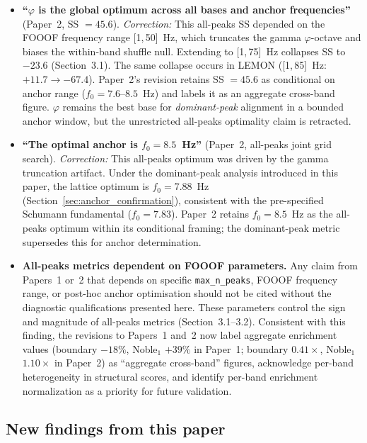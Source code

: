 \documentclass[11pt,a4paper]{article}
\newcommand{\phisym}{\varphi}
\newcommand{\fzero}{f_0}
\begin{document}
\begin{itemize}
    \item \textbf{``$\phisym$ is the global optimum across all bases and anchor frequencies''} (Paper~2, SS $= 45.6$). \textit{Correction:} This all-peaks SS depended on the FOOOF frequency range [1,\,50]~Hz, which truncates the gamma $\phisym$-octave and biases the within-band shuffle null. Extending to [1,\,75]~Hz collapses SS to $-23.6$ (Section~3.1). The same collapse occurs in LEMON ([1,\,85]~Hz: $+11.7 \to -67.4$). Paper~2's revision retains SS $= 45.6$ as conditional on anchor range ($\fzero = 7.6$--$8.5$~Hz) and labels it as an aggregate cross-band figure. $\phisym$ remains the best base for \textit{dominant-peak} alignment in a bounded anchor window, but the unrestricted all-peaks optimality claim is retracted.
    \item \textbf{``The optimal anchor is $\fzero = 8.5$~Hz''} (Paper~2, all-peaks joint grid search). \textit{Correction:} This all-peaks optimum was driven by the gamma truncation artifact. Under the dominant-peak analysis introduced in this paper, the lattice optimum is $\fzero = 7.88$~Hz (Section~\ref{sec:anchor_confirmation}), consistent with the pre-specified Schumann fundamental ($\fzero = 7.83$). Paper~2 retains $\fzero = 8.5$~Hz as the all-peaks optimum within its conditional framing; the dominant-peak metric supersedes this for anchor determination.
    \item \textbf{All-peaks metrics dependent on FOOOF parameters.} Any claim from Papers~1 or~2 that depends on specific \texttt{max\_n\_peaks}, FOOOF frequency range, or post-hoc anchor optimisation should not be cited without the diagnostic qualifications presented here. These parameters control the sign and magnitude of all-peaks metrics (Section~3.1--3.2). Consistent with this finding, the revisions to Papers~1 and~2 now label aggregate enrichment values (boundary $-18\%$, Noble$_1$ $+39\%$ in Paper~1; boundary $0.41\times$, Noble$_1$ $1.10\times$ in Paper~2) as ``aggregate cross-band'' figures, acknowledge per-band heterogeneity in structural scores, and identify per-band enrichment normalization as a priority for future validation.
\end{itemize}

\subsection{New findings from this paper}
\end{document}
